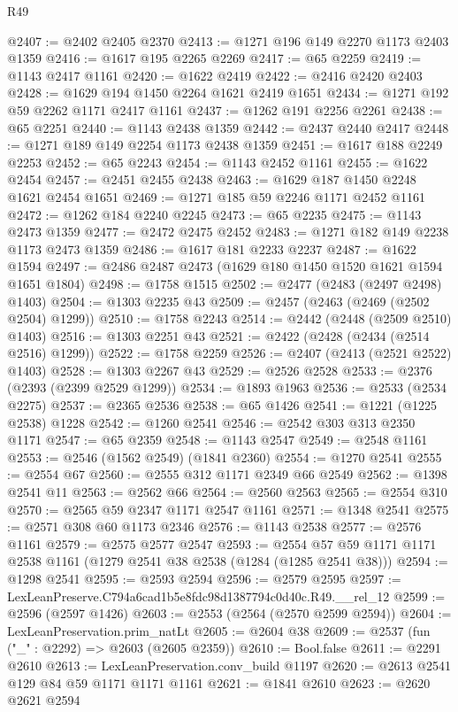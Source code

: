\begin{lexlean}{R49}
\begin{coremodule}
@2407 := @2402 @2405 @2370
@2413 := @1271 @196 @149 @2270 @1173 @2403 @1359
@2416 := @1617 @195 @2265 @2269
@2417 := @65 @2259
@2419 := @1143 @2417 @1161
@2420 := @1622 @2419
@2422 := @2416 @2420 @2403
@2428 := @1629 @194 @1450 @2264 @1621 @2419 @1651
@2434 := @1271 @192 @59 @2262 @1171 @2417 @1161
@2437 := @1262 @191 @2256 @2261
@2438 := @65 @2251
@2440 := @1143 @2438 @1359
@2442 := @2437 @2440 @2417
@2448 := @1271 @189 @149 @2254 @1173 @2438 @1359
@2451 := @1617 @188 @2249 @2253
@2452 := @65 @2243
@2454 := @1143 @2452 @1161
@2455 := @1622 @2454
@2457 := @2451 @2455 @2438
@2463 := @1629 @187 @1450 @2248 @1621 @2454 @1651
@2469 := @1271 @185 @59 @2246 @1171 @2452 @1161
@2472 := @1262 @184 @2240 @2245
@2473 := @65 @2235
@2475 := @1143 @2473 @1359
@2477 := @2472 @2475 @2452
@2483 := @1271 @182 @149 @2238 @1173 @2473 @1359
@2486 := @1617 @181 @2233 @2237
@2487 := @1622 @1594
@2497 := @2486 @2487 @2473 (@1629 @180 @1450 @1520 @1621 @1594 @1651 @1804)
@2498 := @1758 @1515
@2502 := @2477 (@2483 (@2497 @2498) @1403)
@2504 := @1303 @2235 @43
@2509 := @2457 (@2463 (@2469 (@2502 @2504) @1299))
@2510 := @1758 @2243
@2514 := @2442 (@2448 (@2509 @2510) @1403)
@2516 := @1303 @2251 @43
@2521 := @2422 (@2428 (@2434 (@2514 @2516) @1299))
@2522 := @1758 @2259
@2526 := @2407 (@2413 (@2521 @2522) @1403)
@2528 := @1303 @2267 @43
@2529 := @2526 @2528
@2533 := @2376 (@2393 (@2399 @2529 @1299))
@2534 := @1893 @1963
@2536 := @2533 (@2534 @2275)
@2537 := @2365 @2536
@2538 := @65 @1426
@2541 := @1221 (@1225 @2538) @1228
@2542 := @1260 @2541
@2546 := @2542 @303 @313 @2350 @1171
@2547 := @65 @2359
@2548 := @1143 @2547
@2549 := @2548 @1161
@2553 := @2546 (@1562 @2549) (@1841 @2360)
@2554 := @1270 @2541
@2555 := @2554 @67
@2560 := @2555 @312 @1171 @2349 @66 @2549
@2562 := @1398 @2541 @11
@2563 := @2562 @66
@2564 := @2560 @2563
@2565 := @2554 @310
@2570 := @2565 @59 @2347 @1171 @2547 @1161
@2571 := @1348 @2541
@2575 := @2571 @308 @60 @1173 @2346
@2576 := @1143 @2538
@2577 := @2576 @1161
@2579 := @2575 @2577 @2547
@2593 := @2554 @57 @59 @1171 @1171 @2538 @1161 (@1279 @2541 @38 @2538 (@1284 (@1285 @2541 @38)))
@2594 := @1298 @2541
@2595 := @2593 @2594
@2596 := @2579 @2595
@2597 := LexLeanPreserve.C794a6cad1b5e8fdc98d1387794c0d40c.R49.__rel_12
@2599 := @2596 (@2597 @1426)
@2603 := @2553 (@2564 (@2570 @2599 @2594))
@2604 := LexLeanPreservation.prim_natLt
@2605 := @2604 @38
@2609 := @2537 (fun ("_" : @2292) => @2603 (@2605 @2359))
@2610 := Bool.false
@2611 := @2291 @2610
@2613 := LexLeanPreservation.conv_build @1197
@2620 := @2613 @2541 @129 @84 @59 @1171 @1171 @1161
@2621 := @1841 @2610
@2623 := @2620 @2621 @2594

\end{coremodule}
\end{lexlean}
